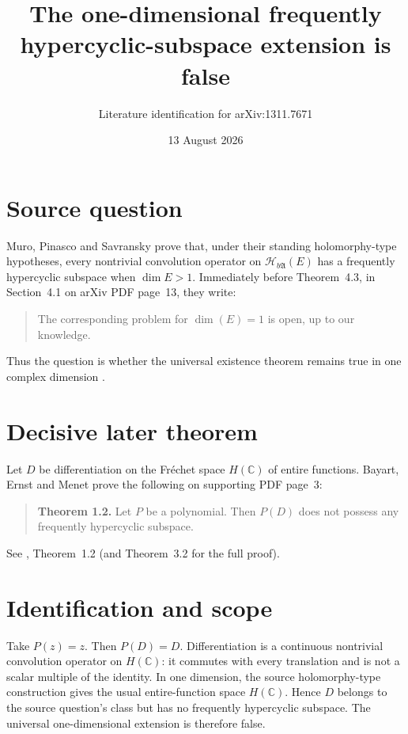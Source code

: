 \documentclass[11pt]{article}
\title{The one-dimensional frequently hypercyclic-subspace extension is false}
\author{Literature identification for arXiv:1311.7671}
\date{13 August 2026}
\begin{document}
\maketitle

\begin{center}
\end{center}

\section*{Source question}

Muro, Pinasco and Savransky prove that, under their standing holomorphy-type
hypotheses, every nontrivial convolution operator on
$\mathcal H_{b\mathfrak A}(E)$ has a frequently hypercyclic subspace when
$\dim E>1$.  Immediately before Theorem~4.3, in Section~4.1 on arXiv PDF
page~13, they write:
\begin{quote}
The corresponding problem for $\dim(E)=1$ is open, up to our knowledge.
\end{quote}
Thus the question is whether the universal existence theorem remains true in
one complex dimension \cite{MPS}.

\section*{Decisive later theorem}

Let $D$ be differentiation on the Fr\'echet space $H(\mathbb C)$ of entire
functions.  Bayart, Ernst and Menet prove the following on supporting PDF
page~3:
\begin{quote}
\textbf{Theorem 1.2.} Let $P$ be a polynomial. Then $P(D)$ does not possess
any frequently hypercyclic subspace.
\end{quote}
See \cite{BEM}, Theorem~1.2 (and Theorem~3.2 for the full proof).

\section*{Identification and scope}

Take $P(z)=z$.  Then $P(D)=D$.  Differentiation is a continuous nontrivial
convolution operator on $H(\mathbb C)$: it commutes with every translation and
is not a scalar multiple of the identity.  In one dimension, the source
holomorphy-type construction gives the usual entire-function space
$H(\mathbb C)$.  Hence $D$ belongs to the source question's class but has no
frequently hypercyclic subspace.  The universal one-dimensional extension is
therefore false.
\end{document}
